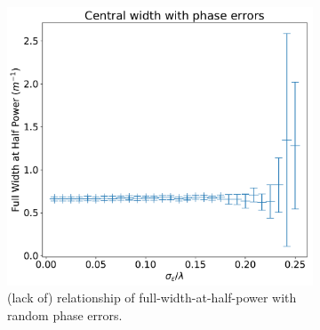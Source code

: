 \documentclass[11pt]{article}
\begin{document}
\begin{figure}
\begin{subfigure}{0.45\textwidth}
        \includegraphics[width=\textwidth]{pictures/rand/size}
        \caption{(lack of) relationship of full-width-at-half-power with random phase errors.}\label{fig:rand:size}
    \end{subfigure}
    \caption{}\label{fig:rand}
\end{figure}
\end{document}

